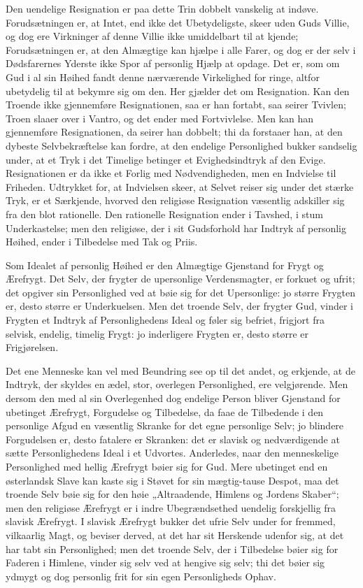\documentclass[12pt]{book}
\begin{document}
Den uendelige Resignation er paa dette Trin dobbelt vanskelig at
indøve. Forudsætningen er, at Intet, end ikke det Ubetydeligste,
skeer uden Guds Villie, og dog ere Virkninger af denne Villie ikke
umiddelbart til at kjende; Forudsætningen er, at den Almægtige kan
hjælpe i alle Farer, og dog er der selv i Dødsfarernes Yderste ikke
Spor af personlig Hjælp at opdage. Det er, som om Gud i al sin
Høihed fandt denne nærværende Virkelighed for ringe, altfor
ubetydelig til at bekymre sig om den. Her gjælder det om
Resignation. Kan den Troende ikke gjennemføre Resignationen, saa er
han fortabt, saa seirer Tvivlen; Troen slaaer over i Vantro, og det
ender med Fortvivlelse. Men kan han gjennemføre Resignationen, da
seirer han dobbelt; thi da forstaaer han, at den dybeste
Selvbekræftelse kan fordre, at den endelige Personlighed bukker
sandselig under, at et Tryk i det Timelige betinger et
Evighedsindtryk af den Evige. Resignationen er da ikke et Forlig med
Nødvendigheden, men en Indvielse til Friheden. Udtrykket for, at
Indvielsen skeer, at Selvet reiser sig under det stærke Tryk, er et
Særkjende, hvorved den religiøse Resignation væsentlig adskiller sig
fra den blot rationelle. Den rationelle Resignation ender i Tavshed,
i stum Underkastelse; men den religiøse, der i sit Gudsforhold har
Indtryk af personlig Høihed, ender i Tilbedelse med Tak og Priis.

Som Idealet af personlig Høihed er den Almægtige Gjenstand for Frygt
og Ærefrygt. Det Selv, der frygter de upersonlige Verdensmagter, er
forkuet og ufrit; det opgiver sin Personlighed ved at bøie sig for
det Upersonlige: jo større Frygten er, desto større er
Underkuelsen. Men det troende Selv, der frygter Gud, vinder i
Frygten et Indtryk af Personlighedens Ideal og føler sig befriet,
frigjort fra selvisk, endelig, timelig Frygt: jo inderligere Frygten
er, desto større er Frigjørelsen.

Det ene Menneske kan vel med Beundring see op til det andet, og
erkjende, at de Indtryk, der skyldes en ædel, stor, overlegen
Personlighed, ere velgjørende. Men dersom den med al sin
Overlegenhed dog endelige Person bliver Gjenstand for ubetinget
Ærefrygt, Forgudelse og Tilbedelse, da faae de Tilbedende i den
personlige Afgud en væsentlig Skranke for det egne personlige Selv;
jo blindere Forgudelsen er, desto fatalere er Skranken: det er
slavisk og nedværdigende at sætte Personlighedens Ideal i et
Udvortes. Anderledes, naar den menneskelige Personlighed med hellig
Ærefrygt bøier sig for Gud. Mere ubetinget end en østerlandsk Slave
kan kaste sig i Støvet for sin mægtig-tause Despot, maa det troende
Selv bøie sig for den høie „Altraadende, Himlens og Jordens
Skaber“; men den religiøse Ærefrygt er i indre Ubegrændsethed
uendelig forskjellig fra slavisk Ærefrygt. I slavisk Ærefrygt bukker
det ufrie Selv under for fremmed, vilkaarlig Magt, og beviser
derved, at det har sit Herskende udenfor sig, at det har tabt sin
Personlighed; men det troende Selv, der i Tilbedelse bøier sig for
Faderen i Himlene, vinder sig selv ved at hengive sig selv; thi det
bøier sig ydmygt og dog personlig frit for sin egen Personligheds
Ophav.
\end{document}
